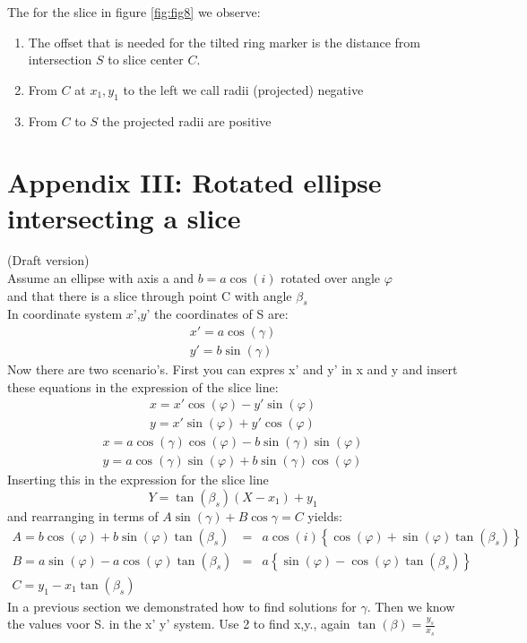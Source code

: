 \documentclass[11pt,a4paper]{article}
\newcommand{\sinb}[1]{\sin \left( #1 \right)}
\newcommand{\cosb}[1]{\cos \left( #1 \right)}
\newcommand{\tanb}[1]{\tan \left( #1 \right)}
\begin{document}
The for the slice in figure \ref{fig:fig8} we observe:
\begin{enumerate}
\item The offset that is needed for the tilted ring marker is the 
      distance from intersection $S$ to slice center $C$.
\item From $C$ at $x_1,y_1$ to the left we call radii (projected) negative
\item From $C$ to $S$ the projected radii are positive
\end{enumerate}
\pagebreak



\section*{Appendix III: Rotated ellipse intersecting a slice}
(Draft version)\\
Assume an ellipse with axis a and $b = a\cosb{i}$ rotated over angle $\varphi$ \\
and that there is a slice through point C with angle $\beta_s$\\
In coordinate system $x$',$y$' the coordinates of S are:
\begin{eqnarray}
x' = a \cosb{\gamma}\nonumber\\
y' = b \sinb{\gamma}
\end{eqnarray}
Now there are two scenario's. First you can expres x' and y' in x and y and insert these
equations in the expression of the slice line:
\begin{eqnarray}
x = x' \cosb{\varphi} - y' \sinb{\varphi}\nonumber\\
y = x' \sinb{\varphi} + y' \cosb{\varphi}
\end{eqnarray}
\begin{eqnarray}
x =  a \cosb{\gamma}\cosb{\varphi} - b \sinb{\gamma} \sinb{\varphi}\nonumber\\
y =  a \cosb{\gamma} \sinb{\varphi} + b \sinb{\gamma} \cosb{\varphi}
\end{eqnarray}
Inserting this in the expression for the slice line $$Y = \tanb{\beta_s} (X - x_1) + y_1$$
and rearranging in terms of $A\sinb{\gamma} + B \cos{\gamma} = C$
yields:
\begin{equation}
\begin{array}{llr}
A = b \cosb{\varphi} + b \sinb{\varphi} \tanb{\beta_s} &  = & a \cosb{i} \left\{ \cosb{\varphi} + \sinb{\varphi} \tanb{\beta_s} \right\}\\
B = a \sinb{\varphi} - a \cosb{\varphi} \tanb{\beta_s} & = & a \left\{ \sinb{\varphi} - \cosb{\varphi} \tanb{\beta_s} \right\}\\
C = y_1 - x_1 \tanb{\beta_s} & &
\end{array}
\end{equation}
In a previous section we demonstrated how to find solutions
for $\gamma$. Then we know the values voor S. in the x' y' system.
Use  2  to find x,y., again $\tanb{\beta} = \frac{y_s}{x_s}$\\
\end{document}
